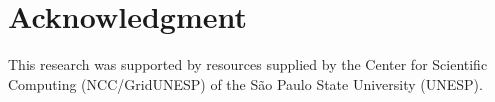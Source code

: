 \documentclass[conference]{IEEEtran}
\begin{document}
\section*{Acknowledgment}
This research was supported by resources supplied by the Center for Scientific Computing
(NCC/GridUNESP) of the São Paulo State University (UNESP).

\FloatBarrier


\end{document}
